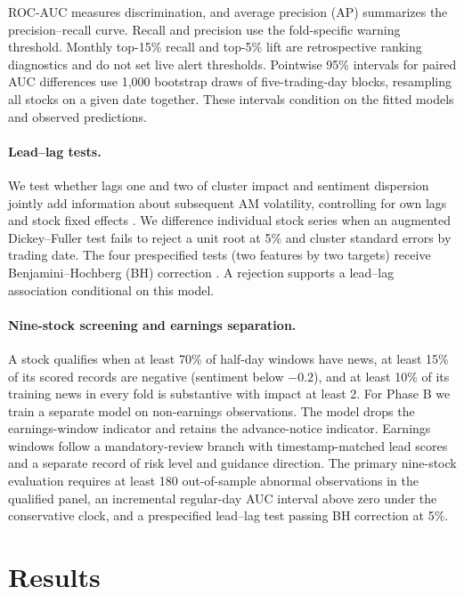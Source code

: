 \documentclass{article}
\begin{document}
ROC-AUC measures discrimination, and average precision (AP) summarizes the precision--recall curve. Recall and precision use the fold-specific warning threshold. Monthly top-15\% recall and top-5\% lift are retrospective ranking diagnostics and do not set live alert thresholds. Pointwise 95\% intervals for paired AUC differences use 1,000 bootstrap draws of five-trading-day blocks, resampling all stocks on a given date together. These intervals condition on the fitted models and observed predictions.

\paragraph{Lead--lag tests.}
We test whether lags one and two of cluster impact and sentiment dispersion jointly add information about subsequent AM volatility, controlling for own lags and stock fixed effects \citep{granger1969investigating}. We difference individual stock series when an augmented Dickey--Fuller test fails to reject a unit root at 5\% and cluster standard errors by trading date. The four prespecified tests (two features by two targets) receive Benjamini--Hochberg (BH) correction \citep{benjamini1995controlling}. A rejection supports a lead--lag association conditional on this model.

\paragraph{Nine-stock screening and earnings separation.}
A stock qualifies when at least 70\% of half-day windows have news, at least 15\% of its scored records are negative (sentiment below $-0.2$), and at least 10\% of its training news in every fold is substantive with impact at least 2. For Phase B we train a separate model on non-earnings observations. The model drops the earnings-window indicator and retains the advance-notice indicator. Earnings windows follow a mandatory-review branch with timestamp-matched lead scores and a separate record of risk level and guidance direction. The primary nine-stock evaluation requires at least 180 out-of-sample abnormal observations in the qualified panel, an incremental regular-day AUC interval above zero under the conservative clock, and a prespecified lead--lag test passing BH correction at 5\%.

\section{Results}
\label{sec:results}
\end{document}
